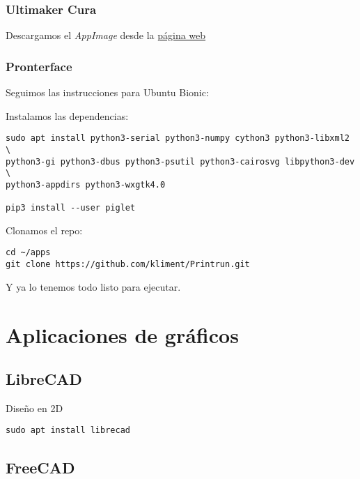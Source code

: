 \documentclass[
  12pt,
  spanish,
]{article}
\begin{document}
\hypertarget{ultimaker-cura}{%
\subsubsection{Ultimaker Cura}\label{ultimaker-cura}}

Descargamos el \emph{AppImage} desde la
\href{https://github.com/Ultimaker/Cura/releases}{página web}

\hypertarget{pronterface}{%
\subsubsection{Pronterface}\label{pronterface}}

Seguimos las instrucciones para Ubuntu Bionic:

Instalamos las dependencias:

\begin{verbatim}
sudo apt install python3-serial python3-numpy cython3 python3-libxml2 \
python3-gi python3-dbus python3-psutil python3-cairosvg libpython3-dev \
python3-appdirs python3-wxgtk4.0

pip3 install --user piglet
\end{verbatim}

Clonamos el repo:

\begin{verbatim}
cd ~/apps
git clone https://github.com/kliment/Printrun.git
\end{verbatim}

Y ya lo tenemos todo listo para ejecutar.

\hypertarget{aplicaciones-de-gruxe1ficos}{%
\section{Aplicaciones de gráficos}\label{aplicaciones-de-gruxe1ficos}}

\hypertarget{librecad}{%
\subsection{LibreCAD}\label{librecad}}

Diseño en 2D

\begin{verbatim}
sudo apt install librecad
\end{verbatim}

\hypertarget{freecad}{%
\subsection{FreeCAD}\label{freecad}}
\end{document}
